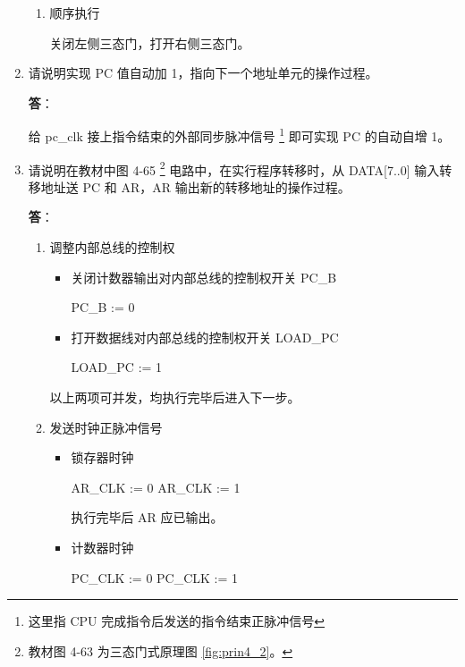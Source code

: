 \begin{enumerate}
\begin{enumerate}
        \item 顺序执行

        关闭左侧三态门，打开右侧三态门。        
        
    \end{enumerate}
    
    \item 请说明实现 PC 值自动加 1，指向下一个地址单元的操作过程。

    \textbf{答}：
    
    给 pc\_clk 接上指令结束的外部同步脉冲信号 \footnote{这里指 CPU 完成指令后发送的指令结束正脉冲信号} 即可实现 PC 的自动自增 1。
    
    \item 请说明在教材中图 4-65 \footnote{教材图 4-63 为三态门式原理图 \ref{fig:prin4_2}。} 电路中，在实行程序转移时，从 DATA[7..0] 输入转移地址送 PC 和 AR，AR 输出新的转移地址的操作过程。
    
    \textbf{答}：
    
    \begin{enumerate}
        \item 调整内部总线的控制权
        
        \begin{itemize}
            \item 关闭计数器输出对内部总线的控制权开关 PC\_B
            
            PC\_B := 0
            
            \item 打开数据线对内部总线的控制权开关 LOAD\_PC
            
            LOAD\_PC := 1
            
        \end{itemize}
        
        以上两项可并发，均执行完毕后进入下一步。
        
        \item 发送时钟正脉冲信号
        
        \begin{itemize}
            \item 锁存器时钟
            
            AR\_CLK := 0
            AR\_CLK := 1
            
            执行完毕后 AR 应已输出。
            
            \item 计数器时钟
            
            PC\_CLK := 0
            PC\_CLK := 1


\end{itemize}
\end{enumerate}
\end{enumerate}
